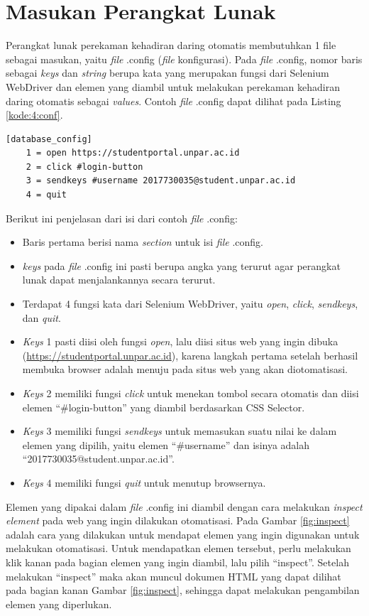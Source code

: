 \section{Masukan Perangkat Lunak}
\label{sec:inputConfig} 
Perangkat lunak perekaman kehadiran daring otomatis membutuhkan 1 file sebagai masukan, yaitu \textit{file} .config (\textit{file} konfigurasi). Pada \textit{file} .config, nomor baris sebagai \textit{keys} dan \textit{string} berupa kata yang merupakan fungsi dari Selenium WebDriver dan elemen yang diambil untuk melakukan perekaman kehadiran daring otomatis sebagai \textit{values}. Contoh \textit{file} .config dapat dilihat pada Listing \ref{kode:4:conf}.
\begin{lstlisting}[caption=Contoh \textit{file} .config untuk Masukan Perangkat Lunak Perekaman Kehadiran Daring Otomatis, label=kode:4:conf]
	[database_config]
	1 = open https://studentportal.unpar.ac.id
	2 = click #login-button
	3 = sendkeys #username 2017730035@student.unpar.ac.id 
	4 = quit
\end{lstlisting}
Berikut ini penjelasan dari isi dari contoh \textit{file} .config:
\begin{itemize}
	\item Baris pertama berisi nama \textit{section} untuk isi \textit{file} .config.
	\item \textit{keys} pada \textit{file} .config ini pasti berupa angka yang terurut agar perangkat lunak dapat menjalankannya secara terurut.
	\item Terdapat 4 fungsi kata dari Selenium WebDriver, yaitu \textit{open}, \textit{click}, \textit{sendkeys}, dan \textit{quit}.
	\item \textit{Keys} 1 pasti diisi oleh fungsi \textit{open}, lalu diisi situs web yang ingin dibuka (\url{https://studentportal.unpar.ac.id}), karena langkah pertama setelah berhasil membuka browser adalah menuju pada situs web yang akan diotomatisasi.
	\item \textit{Keys} 2 memiliki fungsi \textit{click} untuk menekan tombol secara otomatis dan diisi elemen ``\#login-button'' yang diambil berdasarkan CSS Selector.
	\item \textit{Keys} 3 memiliki fungsi \textit{sendkeys} untuk memasukan suatu nilai ke dalam elemen yang dipilih, yaitu elemen ``\#username'' dan isinya adalah ``2017730035@student.unpar.ac.id''.
	\item \textit{Keys} 4 memiliki fungsi \textit{quit} untuk menutup browsernya.
\end{itemize}
Elemen yang dipakai dalam \textit{file} .config ini diambil dengan cara melakukan \textit{inspect element} pada web yang ingin dilakukan otomatisasi. Pada Gambar \ref{fig:inspect} adalah cara yang dilakukan untuk mendapat elemen yang ingin digunakan untuk melakukan otomatisasi. Untuk mendapatkan elemen tersebut, perlu melakukan klik kanan pada bagian elemen yang ingin diambil, lalu pilih ``inspect''. Setelah melakukan ``inspect'' maka akan muncul dokumen HTML yang dapat dilihat pada bagian kanan Gambar \ref{fig:inspect}, sehingga dapat melakukan pengambilan elemen yang diperlukan.
